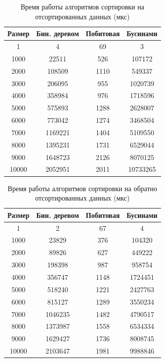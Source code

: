 \begin{table}[h]
	\begin{center}
		\caption{Время работы алгоритмов сортировки на отсортированных данных (мкс)}
		\label{tbl:best}
		\begin{tabular}{|c|c|c|c|}
			\hline
			Размер & Бин. деревом &  Побитовая &  Бусинами \\
			\hline
			1 & 4 & 69 & 3\\
			\hline
			1000 & 22511 & 526 & 107172\\
			\hline
			2000 & 108509 & 1110 & 549337\\
			\hline
			3000 & 206095 & 955 & 1020739\\
			\hline
			4000 & 358984 & 976 & 1718596\\
			\hline
			5000 & 575893 & 1288 & 2628007\\
			\hline
			6000 & 773042 & 1274 & 3468504\\
			\hline
			7000 & 1169221 & 1404 & 5109550\\
			\hline
			8000 & 1395231 & 1731 & 6529044\\
			\hline
			9000 & 1648723 & 2126 & 8070125\\
			\hline
			10000 & 2052951 & 2011 & 10733265\\
			\hline
		\end{tabular}
	\end{center}
	
\end{table}

\begin{table}[h]
	\begin{center}
		\caption{ Время работы алгоритмов сортировки на обратно	отсортированных данных (мкс)}
		\label{tbl:wor}
		\begin{tabular}{|c|c|c|c|}
			\hline
			Размер & Бин. деревом &  Побитовая &  Бусинами \\
			\hline
			1 & 2 & 67 & 4\\
			\hline
			1000 & 23829 & 376 & 104320\\
			\hline
			2000 & 89826 & 627 & 449222\\
			\hline
			3000 & 198398 & 987 & 958754\\
			\hline
			4000 & 356747 & 1148 & 1724451\\
			\hline
			5000 & 518240 & 1221 & 2427763\\
			\hline
			6000 & 815127 & 1289 & 3550234\\
			\hline
			7000 & 1046235 & 1482 & 4790517\\
			\hline
			8000 & 1373987 & 1558 & 6534334\\
			\hline
			9000 & 1629427 & 1736 & 8008745\\
			\hline
			10000 & 2103647 & 1981 & 9988846\\
			\hline
		\end{tabular}
	\end{center}
	
\end{table}

